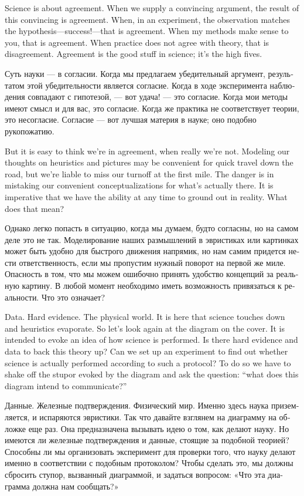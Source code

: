 \documentclass[a4paper]{book}
\theoremstyle{myth}
\begin{document}
\begin{russian}
Science is about agreement. When we supply a convincing argument, the result of this convincing is agreement. When, in an experiment, the observation matches the hypothesis---success!---that is agreement. When my methods make sense to you, that is agreement. When practice does not agree with theory, that is disagreement. Agreement is the good stuff in science; it's the high fives.

 Суть науки — в согласии. Когда мы предлагаем убедительный аргумент,  результатом этой убедительности является согласие. Когда в ходе эксперимента наблюдения совпадают с гипотезой, — вот удача! — это согласие. Когда мои методы имеют смысл и для вас, это согласие. Когда же практика не соответствует теории, это несогласие. Согласие — вот лучшая материя в науке; оно подобно рукопожатию.

But it is easy to think we're in agreement, when really we're not. Modeling our thoughts on heuristics and pictures may be convenient for quick travel down the road, but we're liable to miss our turnoff at the first mile. The danger is in mistaking our convenient conceptualizations for what's actually there. It is imperative that we have the ability at any time to ground out in reality. What does that mean?

 Однако легко попасть в ситуацию, когда мы думаем, будто согласны, но на самом деле это не так. Моделирование наших размышлений в эвристиках или картинках может быть удобно для быстрого движения напрямик, но нам самим придется нести ответственность, если мы пропустим нужный поворот на первой же миле. Опасность в том, что мы можем ошибочно принять удобство концепций за реальную картину. В любой момент необходимо иметь возможность привязаться к реальности. Что это означает? 

Data. Hard evidence. The physical world. It is here that science touches down and heuristics evaporate. So let's look again at the diagram on the cover. It is intended to evoke an idea of how science is performed. Is there hard evidence and data to back this theory up? Can we set up an experiment to find out whether science is actually performed according to such a protocol? To do so we have to shake off the stupor evoked by the diagram and ask the question: “what does this diagram intend to communicate?”

Данные. Железные подтверждения. Физический мир. Именно здесь наука приземляется, и испаряются эвристики. Так что давайте взглянем на диаграмму на обложке еще раз. Она предназначена вызывать идею о том, как делают науку. Но имеются ли железные подтверждения и данные, стоящие за подобной теорией? Способны ли мы организовать эксперимент для проверки того, что науку делают именно в соответствии с подобным протоколом? Чтобы сделать это, мы должны сбросить ступор, вызванный диаграммой, и задаться вопросом: «Что эта диаграмма должна нам сообщать?» 


\end{russian}
\end{document}
